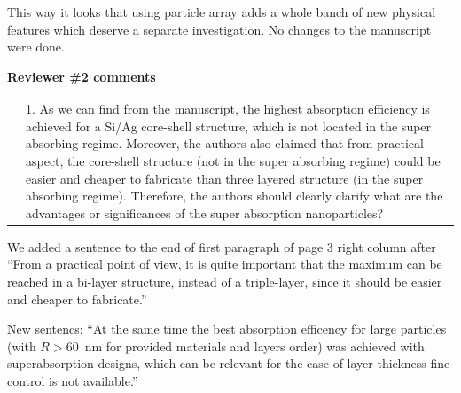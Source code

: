 \documentclass[a4paper]{article}
\begin{document}
This way it looks that using particle array adds a whole banch of new
physical features which deserve a separate investigation. No changes
to the manuscript were done.





\vspace{10pt}

\newpage
\begin{minipage}{1.0\linewidth}
  \textbf{Reviewer \#2 comments}\\
  \begin{tabular}[!H]{l|p{}}
    \quad & 1.  As we can find from the manuscript, the highest
    absorption efficiency is achieved for a Si/Ag core-shell
    structure, which is not located in the super absorbing
    regime. Moreover, the authors also claimed that from practical
    aspect, the core-shell structure (not in the super absorbing
    regime) could be easier and cheaper to fabricate than three
    layered structure (in the super absorbing regime). Therefore, the
    authors should clearly clarify what are the advantages or
    significances of the super absorption nanoparticles? 
\end{tabular}
\end{minipage}

We added a sentence to the end of first paragraph of page 3 right
column after ``From a practical point of view, it is
quite important that the maximum can be reached in a bi-layer
structure, instead of a triple-layer, since it should be easier and
cheaper to fabricate.''

New sentencs: ``At the same time the best absorption efficency for
large particles (with $R>60$~nm for provided materials and layers
order) was achieved with superabsorption designs, which can be
relevant for the case of layer thickness fine control is not
available.''


\end{document}
